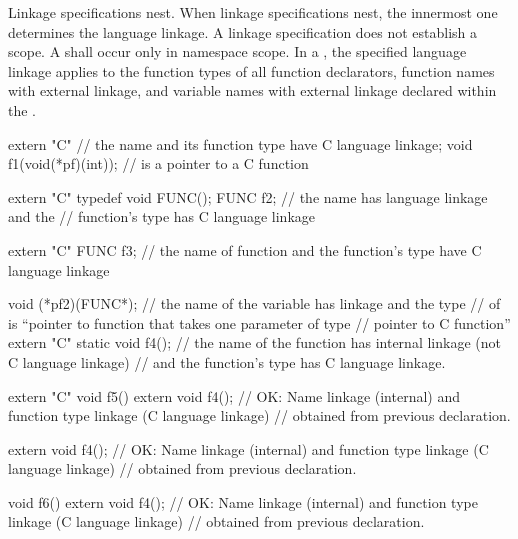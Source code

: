 \pnum
{}%
Linkage specifications nest. When linkage specifications nest, the
innermost one determines the language linkage. A linkage specification
does not establish a scope. A  shall
occur only in namespace scope. In a
, the specified language linkage applies
to the function types of all function declarators, function names with
external linkage, and variable names with external linkage declared
within the .
\begin{example}
\begin{codeblock}
extern "C"                      // the name  and its function type have C language linkage;
  void f1(void(*pf)(int));      //  is a pointer to a C function

extern "C" typedef void FUNC();
FUNC f2;                        // the name  has \Cpp{} language linkage and the
                                // function's type has C language linkage

extern "C" FUNC f3;             // the name of function  and the function's type have C language linkage

void (*pf2)(FUNC*);             // the name of the variable  has \Cpp{} linkage and the type
                                // of  is ``pointer to \Cpp{} function that takes one parameter of type
                                // pointer to C function''
extern "C" {
  static void f4();             // the name of the function  has internal linkage (not C language linkage)
                                // and the function's type has C language linkage.
}

extern "C" void f5() {
  extern void f4();             // OK: Name linkage (internal) and function type linkage (C language linkage)
                                // obtained from previous declaration.
}

extern void f4();               // OK: Name linkage (internal) and function type linkage (C language linkage)
                                // obtained from previous declaration.

void f6() {
  extern void f4();             // OK: Name linkage (internal) and function type linkage (C language linkage)
                                // obtained from previous declaration.
}
\end{codeblock}
\end{example}
